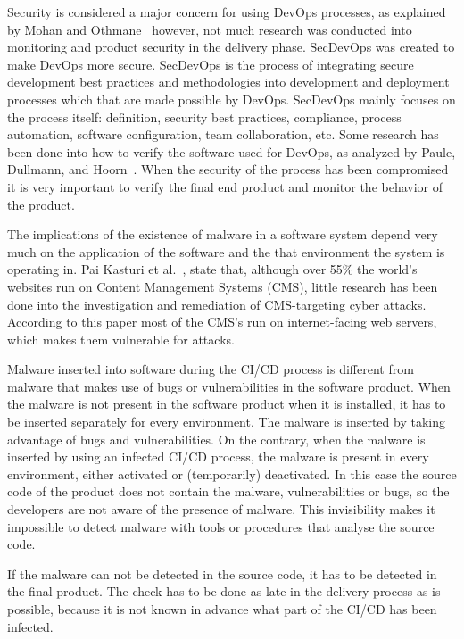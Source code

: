 \documentclass[a4paper, 10pt, conference]{ieeeconf}
\begin{document}
Security is considered a major concern for using DevOps processes, as explained by Mohan and Othmane~\cite{secdevops} however, not much research was conducted into monitoring and product security in the delivery phase. SecDevOps was created to make DevOps more secure. SecDevOps is the process of integrating secure development best practices and methodologies into development and deployment processes which that are made possible by DevOps. SecDevOps mainly focuses on the process itself: definition, security best practices, compliance, process automation, software configuration, team collaboration, etc. Some research has been done into how to verify the software used for DevOps, as analyzed by Paule, Dullmann, and Hoorn~\cite{8712374}. When the security of the process has been compromised it is very important to verify the final end product and monitor the behavior of the product.

The implications of the existence of malware in a software system depend very much on the application of the software and the that environment the system is operating in. Pai Kasturi et al.~\cite{cms-attacks}, state that, although over 55\% the world’s websites run on Content Management Systems (CMS), little research has been done into the investigation and remediation of CMS-targeting cyber attacks. According to this paper most of the CMS's run on internet-facing web servers, which makes them vulnerable for attacks.

Malware inserted into software during the CI/CD process is different from malware that makes use of bugs or vulnerabilities in the software product. When the malware is not present in the software product when it is installed, it has to be inserted separately for every environment. The malware is inserted by taking advantage of bugs and vulnerabilities. On the contrary, when the malware is inserted by using an infected CI/CD process, the malware is present in every environment, either activated or (temporarily) deactivated. In this case the source code of the product does not contain the malware, vulnerabilities or bugs, so the developers are not aware of the presence of malware. This invisibility makes it impossible to detect malware with tools or procedures that analyse the source code.

If the malware can not be detected in the source code, it has to be detected in the final product. The check has to be done as late in the delivery process as is possible, because it is not known in advance what part of the CI/CD has been infected.
\end{document}
